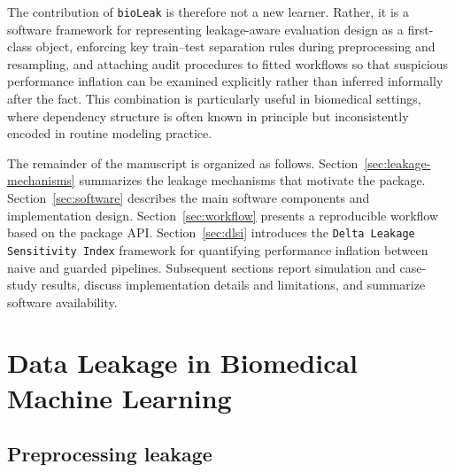 \documentclass[article]{jss}
\begin{document}
The contribution of \texttt{bioLeak} is therefore not a new learner. Rather, it is a software framework for representing leakage-aware evaluation design as a first-class object, enforcing key train--test separation rules during preprocessing and resampling, and attaching audit procedures to fitted workflows so that suspicious performance inflation can be examined explicitly rather than inferred informally after the fact. This combination is particularly useful in biomedical settings, where dependency structure is often known in principle but inconsistently encoded in routine modeling practice.

The remainder of the manuscript is organized as follows. Section~\ref{sec:leakage-mechanisms} summarizes the leakage mechanisms that motivate the package. Section~\ref{sec:software} describes the main software components and implementation design. Section~\ref{sec:workflow} presents a reproducible workflow based on the package API. Section~\ref{sec:dlsi} introduces the \texttt{Delta Leakage Sensitivity Index} framework for quantifying performance inflation between naive and guarded pipelines. Subsequent sections report simulation and case-study results, discuss implementation details and limitations, and summarize software availability.




\section{Data Leakage in Biomedical Machine Learning}\label{sec:leakage}
\subsection{Preprocessing leakage}
\end{document}
